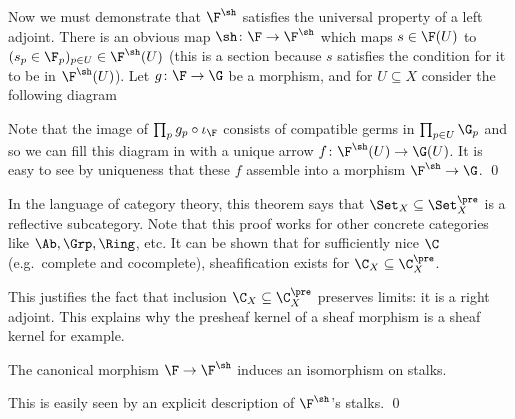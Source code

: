     Now we must demonstrate that $\F^\sh$ satisfies the universal property of a left adjoint.
    There is an obvious map $\sh\colon\F\to\F^\sh$ which maps $s\in\F(U)$ to $(s_p\in\F_p)_{p\in U}\in\F^\sh(U)$ (this is a section because
    $s$ satisfies the condition for it to be in $\F^\sh(U)$).
    Let $g\colon\F\to\G$ be a morphism, and for $U\subseteq X$ consider the following diagram


    Note that the image of $\prod_pg_p\circ\iota_\F$ consists of compatible germs in $\prod_{p\in U}\G_p$ and so we can fill this diagram
    in with a unique arrow $f\colon\F^\sh(U)\to\G(U)$.
    It is easy to see by uniqueness that these $f$ assemble into a morphism $\F^\sh\to\G$.
    \qed

\eproof

\bnote

    In the language of category theory, this theorem says that $\Set_X\subseteq\Set_X^\pre$ is a {\emphcolor reflective subcategory}.
    Note that this proof works for other concrete categories like $\Ab,\Grp,\Ring$, etc.
    It can be shown that for sufficiently nice $\C$ (e.g.\ complete and cocomplete), sheafification exists for $\C_X\subseteq\C_X^\pre$.

    This justifies the fact that inclusion $\C_X\subseteq\C_X^\pre$ preserves limits: it is a right adjoint.
    This explains why the presheaf kernel of a sheaf morphism is a sheaf kernel for example.

\enote

\bprop

    The canonical morphism $\F\to\F^\sh$ induces an isomorphism on stalks.

\eprop

\bproof

    This is easily seen by an explicit description of $\F^\sh$'s stalks.
    \qed

\eproof

\bremark[title={The space of sections of a presheaf}]

